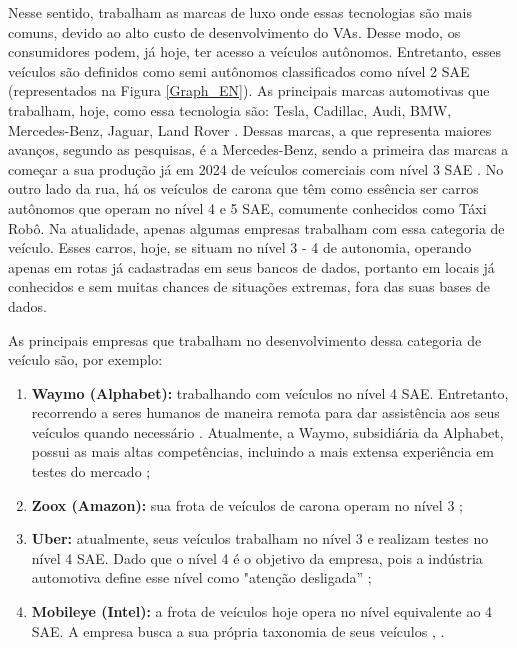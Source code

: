 Nesse sentido, trabalham as marcas de luxo onde essas tecnologias são mais comuns, devido ao alto custo de desenvolvimento do VAs. Desse modo, os consumidores podem, já hoje, ter acesso a veículos autônomos. Entretanto, esses veículos são definidos como semi autônomos classificados como nível 2 SAE (representados na Figura \ref{Graph_EN}). As principais marcas automotivas que trabalham, hoje, como essa tecnologia são: Tesla, Cadillac, Audi, BMW, Mercedes-Benz, Jaguar, Land Rover \cite{caio}. 
Dessas marcas, a que representa maiores avanços, segundo as pesquisas, é a Mercedes-Benz, sendo a primeira das marcas a começar a sua produção já em 2024 de veículos comerciais com nível 3 SAE \cite{mercedes3}.
No outro lado da rua, há os veículos de carona que têm como essência ser carros autônomos que operam no nível 4 e 5 SAE, comumente conhecidos como Táxi Robô. Na atualidade, apenas algumas empresas trabalham com essa categoria de veículo. Esses carros, hoje, se situam no nível 3 - 4 de autonomia, operando apenas em rotas já cadastradas em seus bancos de dados, portanto em locais já conhecidos e sem muitas chances de situações extremas, fora das suas bases de dados. 

As principais empresas que trabalham no desenvolvimento dessa categoria de veículo são, por exemplo:

\begin{enumerate}

   \item \textbf{Waymo (Alphabet):}
         trabalhando com veículos no nível 4 SAE. Entretanto, recorrendo a seres humanos de maneira remota para dar assistência aos seus veículos quando necessário \cite{waymo}. Atualmente, a Waymo, subsidiária da Alphabet, possui as mais altas competências, incluindo a mais extensa experiência em testes do mercado \cite{CAM};
   \item \textbf{Zoox (Amazon):}
         sua frota de veículos de carona operam no nível 3 \cite{zoox};
   \item \textbf{Uber:}
         atualmente, seus veículos trabalham no nível 3 e realizam testes no nível 4 SAE. Dado que o nível 4 é o objetivo da empresa, pois a indústria automotiva define esse nível como "atenção desligada” \cite{uber};
   \item \textbf{Mobileye (Intel):}
         a frota de veículos hoje opera no nível equivalente ao 4 SAE. A empresa busca a sua própria taxonomia de seus veículos \cite{mobileye}, \cite{mobileye1}.
\end{enumerate}

